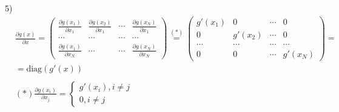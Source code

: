 \documentclass{report}
\begin{document}
\par 5)
\begin{align*}
& \frac{\partial g(x)}{\partial x} = \begin{pmatrix}
    \frac{\partial g(x_1)}{\partial x_1} & \frac{\partial g(x_2)}{\partial x_1} & \cdots & \frac{\partial g(x_N)}{\partial x_1} \\
    \cdots & \cdots & \cdots & \cdots \\
    \frac{\partial g(x_1)}{\partial x_N} & \cdots & \cdots & \frac{\partial g(x_N)}{\partial x_N}
\end{pmatrix} \overset{(*)}{=} \begin{pmatrix}
    g \prime (x_1) & 0 & \cdots & 0 \\
    0 & g \prime (x_2) & \cdots & 0 \\
    \cdots & \cdots & \cdots & \cdots \\
    0 & 0 & \cdots & g \prime (x_N)
\end{pmatrix} = \\
& = \text{diag}(g \prime (x)) \\ \\
& (*) \frac{\partial g(x_i)}{\partial x_j} = \begin{cases}
    g \prime (x_i), i \neq j \\
    0, i \neq j
\end{cases}
\end{align*}
\end{document}
